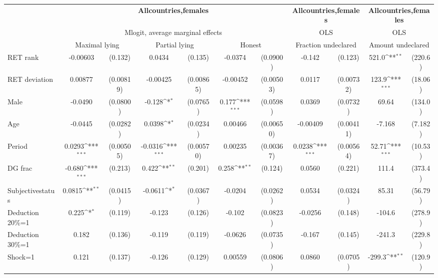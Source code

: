 \def\sym#1{\ifmmode^{#1}\else\(^{#1}\)\fi}
\begin{tabular}{l|cccccc|cc|cc}
\hline\hline
&\multicolumn{6}{c|}{\bf All\space{}countries,\space{}females}&\multicolumn{2}{c|}{\bf All\space{}countries,\space{}females}&\multicolumn{2}{c}{\bf All\space{}countries,\space{}females}\\ &\multicolumn{6}{c|}{Mlogit, average marginal effects }&\multicolumn{2}{c|}{OLS}&\multicolumn{2}{c}{OLS}\\
                &\multicolumn{2}{c}{Maximal lying}&\multicolumn{2}{c}{Partial lying}&\multicolumn{2}{c}{Honest}  &\multicolumn{2}{c}{Fraction undeclared}&\multicolumn{2}{c}{Amount undeclared}\\
\hline
RET rank        & -0.00603         &  (0.132)&   0.0434         &  (0.135)&  -0.0374         & (0.0900)&   -0.142         &  (0.123)&    521.0\sym{**} &  (220.6)\\
RET deviation   &  0.00877         &(0.00819)& -0.00425         &(0.00865)& -0.00452         &(0.00503)&   0.0117         &(0.00732)&    123.9\sym{***}&  (18.06)\\
Male            &  -0.0490         & (0.0800)&   -0.128\sym{*}  & (0.0765)&    0.177\sym{***}& (0.0598)&   0.0369         & (0.0732)&    69.64         &  (134.0)\\
Age             &  -0.0445         & (0.0282)&   0.0398\sym{*}  & (0.0234)&  0.00466         &(0.00650)& -0.00409         &(0.00411)&   -7.168         &  (7.182)\\
Period          &   0.0293\sym{***}&(0.00505)&  -0.0316\sym{***}&(0.00570)&  0.00235         &(0.00367)&   0.0238\sym{***}&(0.00564)&    52.71\sym{***}&  (10.53)\\
DG frac         &   -0.680\sym{***}&  (0.213)&    0.422\sym{**} &  (0.201)&    0.258\sym{**} &  (0.124)&   0.0560         &  (0.221)&    111.4         &  (373.4)\\
Subjective\space{}status&   0.0815\sym{**} & (0.0415)&  -0.0611\sym{*}  & (0.0367)&  -0.0204         & (0.0262)&   0.0534         & (0.0324)&    85.31         &  (56.79)\\
Deduction 20\%=1&    0.225\sym{*}  &  (0.119)&   -0.123         &  (0.126)&   -0.102         & (0.0823)&  -0.0256         &  (0.148)&   -104.6         &  (278.9)\\
Deduction 30\%=1&    0.182         &  (0.136)&   -0.119         &  (0.119)&  -0.0626         & (0.0735)&   -0.167         &  (0.145)&   -241.3         &  (229.8)\\
Shock=1         &    0.121         &  (0.137)&   -0.126         &  (0.129)&  0.00559         & (0.0806)&   0.0860         & (0.0705)&   -299.3\sym{**} &  (120.9)\\

\end{tabular}
